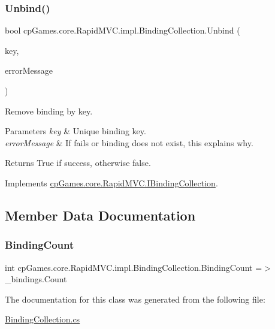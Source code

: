 \subsubsection{\texorpdfstring{Unbind()}{Unbind()}}
{\footnotesize\ttfamily bool cp\+Games.\+core.\+Rapid\+M\+V\+C.\+impl.\+Binding\+Collection.\+Unbind (\begin{DoxyParamCaption}\item[{\mbox{\hyperlink{interfacecp_games_1_1core_1_1_rapid_m_v_c_1_1_i_binding_key}{I\+Binding\+Key}}}]{key,  }\item[{out string}]{error\+Message }\end{DoxyParamCaption})}



Remove binding by key. 


\begin{DoxyParams}{Parameters}
{\em key} & Unique binding key.\\
\hline
{\em error\+Message} & If fails or binding does not exist, this explains why.\\
\hline
\end{DoxyParams}
\begin{DoxyReturn}{Returns}
True if success, otherwise false.
\end{DoxyReturn}


Implements \mbox{\hyperlink{interfacecp_games_1_1core_1_1_rapid_m_v_c_1_1_i_binding_collection_ab20c12c64a91e24e7685780dd64f1d87}{cp\+Games.\+core.\+Rapid\+M\+V\+C.\+I\+Binding\+Collection}}.



\subsection{Member Data Documentation}
\mbox{\label{classcp_games_1_1core_1_1_rapid_m_v_c_1_1impl_1_1_binding_collection_a2566408fe6b484b97b1fad9558efd8bd}} 
\subsubsection{\texorpdfstring{BindingCount}{BindingCount}}
{\footnotesize\ttfamily int cp\+Games.\+core.\+Rapid\+M\+V\+C.\+impl.\+Binding\+Collection.\+Binding\+Count =$>$ \+\_\+bindings.\+Count}



The documentation for this class was generated from the following file\+:\begin{DoxyCompactItemize}
\item 
\mbox{\hyperlink{_binding_collection_8cs}{Binding\+Collection.\+cs}}\end{DoxyCompactItemize}
